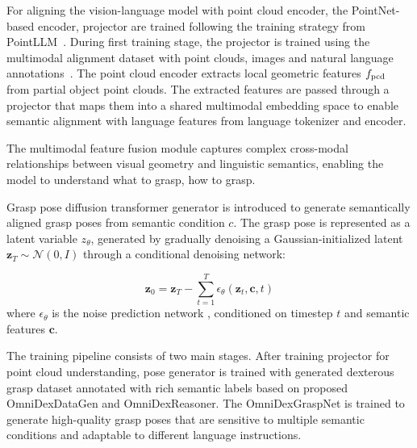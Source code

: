 For aligning the vision-language model with point cloud encoder, the PointNet-based encoder, projector are trained following the training strategy from PointLLM~\cite{xu2025pointllm,xu2024pointllm}. During first training stage, the projector is trained using the multimodal alignment dataset with point clouds, images and natural language annotations~\cite{xu2025pointllm,xu2024pointllm}. The point cloud encoder extracts local geometric features $f_{\rm pcd}$ from partial object point clouds. The extracted features are passed through a projector that maps them into a shared multimodal embedding space to enable semantic alignment with language features from language tokenizer and encoder. 

The multimodal feature fusion module captures complex cross-modal relationships between visual geometry and linguistic semantics, enabling the model to understand what to grasp, how to grasp. 

Grasp pose diffusion transformer generator is introduced to generate semantically aligned grasp poses from semantic condition $c$. 
The grasp pose is represented as a latent variable $z_{\theta}$, generated by gradually denoising a Gaussian-initialized latent $\mathbf{z}_T \sim \mathcal{N}(0, I)$ through a conditional denoising network:

\begin{equation}
\mathbf{z}_0=\mathbf{z}_T-\sum_{t=1}^T \epsilon_\theta\left(\mathbf{z}_t, \mathbf{c}, t\right)
\end{equation}
where $\epsilon_\theta$ is the noise prediction network , conditioned on timestep $t$ and semantic features $\mathbf{c}$. 

The training pipeline consists of two main stages. After training projector for point cloud understanding, pose generator is trained with generated dexterous grasp dataset annotated with rich semantic labels based on proposed OmniDexDataGen and OmniDexReasoner. The OmniDexGraspNet is trained to generate high-quality grasp poses that are sensitive to multiple semantic conditions and adaptable to different language instructions.




